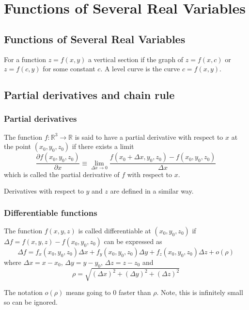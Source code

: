 \documentclass[12pt]{article}
\begin{document}

\tableofcontents
\pagebreak

\section{Functions of Several Real Variables}
	\subsection{Functions of Several Real Variables}
		\begin{defn} 
			For a function $z = f(x,y)$ a vertical section if the graph of $z = f(x,c)$ or $z = f(c,y)$ 
			for some constant $c$. A level curve is the curve $c = f(x,y)$.
		\end{defn}

	\subsection{Partial derivatives and chain rule}

		\subsubsection{Partial derivatives}
		\begin{defn}
			The function $f: \mathbb{R}^3 \to \mathbb{R}$ is said to have a partial derivative with respect to $x$
			at the point $(x_0, y_0, z_0)$ if there exists a limit
				\[
					\frac{\partial f (x_0, y_0, z_0)}{\partial x} \equiv \lim_{\Delta x \to 0} 
					\frac{f(x_0 + \Delta x, y_0, z_0) - f(x_0, y_0, z_0)}{\Delta x}
				\]
			which is called the partial derivative of $f$ with respect to $x$.
		\end{defn}
		
		Derivatives with respect to $y$ and $z$ are defined in a similar way.

		\subsubsection{Differentiable functions}
		\begin{defn}
			The function $f(x,y,z)$ is called differentiable at $(x_0, y_0, z_0)$ if 
			$\Delta f = f(x,y,z) - f(x_0, y_0, z_0)$ can be expressed as
			\[
				\Delta f = f_x(x_0, y_0, z_0) \Delta x + f_y(x_0, y_0, z_0) \Delta y + f_z(x_0, y_0, z_0) \Delta z + o(\rho)
			\]
			where $\Delta x = x - x_0$, $\Delta y = y - y_0$, $\Delta z = z - z_0$ and 
			\[
				\rho = \sqrt{ (\Delta x)^2 + (\Delta y)^2 + (\Delta z)^2 }
			\]
		\end{defn}
		The notation $o(\rho)$ means going to $0$ faster than $\rho$. Note, this is infinitely small so can be ignored.
		
\end{document}
